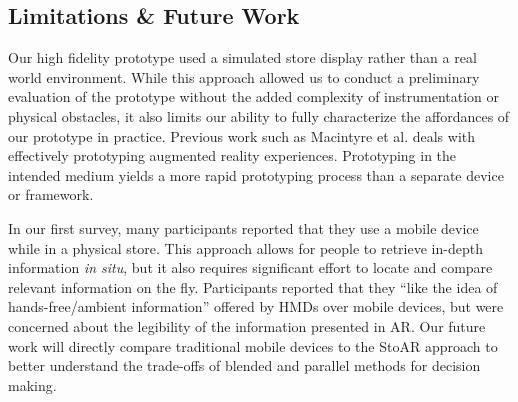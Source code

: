 \subsection{Limitations \& Future Work}
Our high fidelity prototype used a simulated store display rather than a real world environment.  While this approach allowed us to conduct a preliminary evaluation of the prototype without the added complexity of instrumentation or physical obstacles, it also limits our ability to fully characterize the affordances of our prototype in practice. Previous work such as Macintyre et al. \cite{macintyre2004dart} deals with effectively prototyping augmented reality experiences. Prototyping in the intended medium yields a more rapid prototyping process than a separate device or framework.

In our first survey, many participants reported that they use a mobile device while in a physical store. This approach allows for people to retrieve in-depth information \emph{in situ}, but it also requires significant effort to locate and compare relevant information on the fly. Participants reported that they ``like the idea of hands-free/ambient information'' offered by HMDs over mobile devices, but were concerned about the legibility of the information presented in AR. Our future work will directly compare traditional mobile devices to the StoAR approach to better understand the trade-offs of blended and parallel methods for decision making. 

